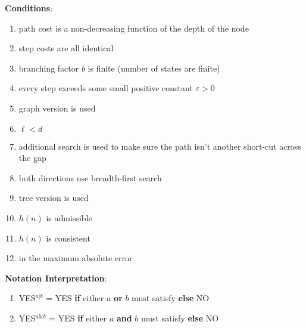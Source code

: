 \vspace{0.5cm}
\textbf{Conditions}:
\vspace{0.2cm}
\begin{enumerate}[itemsep=0.1cm]
\item path cost is a non-decreasing function of the depth of the node
\item step costs are all identical
\item branching factor $b$ is finite (number of states are finite)
\item every step exceeds some small positive constant $\varepsilon > 0$
\item graph version is used
\item $\ell < d$
\item additional search is used to make sure the path isn’t another short-cut across the gap
\item both directions use breadth-first search
\item tree version is used
\item $h(n)$ is admissible
\item $h(n)$ is consistent
\item in the maximum absolute error
\end{enumerate}


\vspace{0.5cm}
\textbf{Notation Interpretation}:
\vspace{0.2cm}
\begin{enumerate}[itemsep=0.2cm]

\item YES$^{a|b}$ = YES \textbf{if} either $a$ \textbf{or} $b$ must satisfy \textbf{else} NO

\item YES$^{a\&b}$ = YES \textbf{if} either $a$ \textbf{and} $b$ must satisfy \textbf{else} NO

\end{enumerate}














